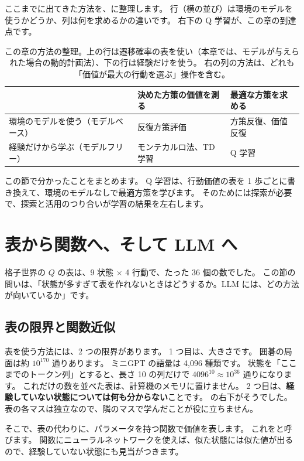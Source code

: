 ここまでに出てきた方法を、に整理します。
行（横の並び）は環境のモデルを使うかどうか、列は何を求めるかの違いです。
右下の Q 学習が、この章の到達点です。

\begin{table}[tbp]
\centering
\caption{この章の方法の整理。上の行は遷移確率の表を使い（本章では、モデルが与えられた場合の動的計画法）、下の行は経験だけを使う。
右の列の方法は、どれも「価値が最大の行動を選ぶ」操作を含む。}
\label{tab:rlb-methods}
\small
\begin{tabular}{lll}
\toprule
 & 決めた方策の価値を測る & 最適な方策を求める \\
\midrule
環境のモデルを使う（モデルベース） & 反復方策評価 & 方策反復、価値反復 \\
経験だけから学ぶ（モデルフリー） & モンテカルロ法、TD 学習 & Q 学習 \\
\bottomrule
\end{tabular}
\end{table}

この節で分かったことをまとめます。
Q 学習は、行動価値の表を 1 歩ごとに書き換えて、環境のモデルなしで最適方策を学びます。
そのためには探索が必要で、探索と活用のつり合いが学習の結果を左右します。

\section{表から関数へ、そして LLM へ}\label{sec:rlb-fa}

格子世界の $Q$ の表は、9 状態 $\times$ 4 行動で、たった 36 個の数でした。
この節の問いは、「状態が多すぎて表を作れないときはどうするか。LLM には、どの方法が向いているか」です。

\subsection*{表の限界と関数近似}

表を使う方法には、2 つの限界があります。
1 つ目は、大きさです。
囲碁の局面は約 $10^{170}$ 通りあります。
ミニGPT の語彙は 4,096 種類です。
状態を「ここまでのトークン列」とすると、長さ 10 の列だけで $4096^{10}\approx10^{36}$ 通りになります。
これだけの数を並べた表は、計算機のメモリに置けません。
2 つ目は、\textbf{経験していない状態については何も分からない}ことです。
の右下がそうでした。
表の各マスは独立なので、隣のマスで学んだことが役に立ちません。

そこで、表の代わりに、パラメータを持つ関数で価値を表します。
これをと呼びます。
関数にニューラルネットワークを使えば、似た状態には似た値が出るので、経験していない状態にも見当がつきます。

